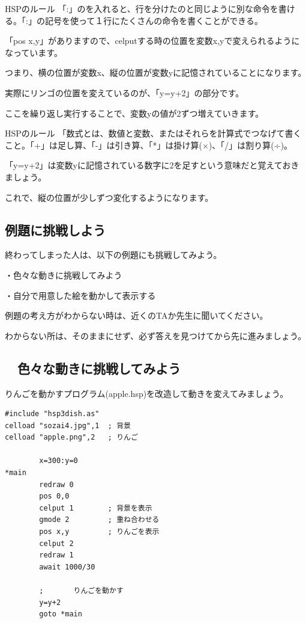 \documentclass[text04.tex]{subfiles}
\begin{document}
\begin{itembox}[c]{HSPのルール}
    「:」のを入れると、行を分けたのと同じように別な命令を書ける。「:」の記号を使って１行にたくさんの命令を書くことができる。
\end{itembox}

「pos x,y」がありますので、celputする時の位置を変数x,yで変えられるようになっています。

つまり、横の位置が変数x、縦の位置が変数yに記憶されていることになります。

実際にリンゴの位置を変えているのが、「y=y+2」の部分です。

ここを繰り返し実行することで、変数yの値が2ずつ増えていきます。


\begin{itembox}[c]{HSPのルール}
    「数式とは、数値と変数、またはそれらを計算式でつなげて書くこと。「+」は足し算、「-」は引き算、「*」は掛け算(×)、「/」は割り算(÷)。
\end{itembox}



「y=y+2」は変数yに記憶されている数字に2を足すという意味だと覚えておきましょう。

これで、縦の位置が少しずつ変化するようになります。
\newpage
\subsection{例題に挑戦しよう}


終わってしまった人は、以下の例題にも挑戦してみよう。

・色々な動きに挑戦してみよう

・自分で用意した絵を動かして表示する

例題の考え方がわからない時は、近くのTAか先生に聞いてください。

わからない所は、そのままにせず、必ず答えを見つけてから先に進みましょう。


\newpage
\subsection{\useOmetoiExample　色々な動きに挑戦してみよう}


\exampleinduction

りんごを動かすプログラム(apple.hsp)を改造して動きを変えてみましょう。

\begin{lstlisting}[caption=fall.hspのプログラム]
#include "hsp3dish.as"
celload "sozai4.jpg",1  ; 背景
celload "apple.png",2   ; りんご

        x=300:y=0
*main
        redraw 0
        pos 0,0
        celput 1        ; 背景を表示
        gmode 2         ; 重ね合わせる
        pos x,y         ; りんごを表示
        celput 2
        redraw 1
        await 1000/30

        ;       りんごを動かす
        y=y+2
        goto *main
\end{lstlisting}
\end{document}
